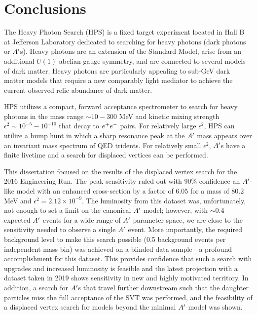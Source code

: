 \chapter{Conclusions}\label{chap:conclusion}

The Heavy Photon Search (HPS) is a fixed target experiment located in Hall B at Jefferson Laboratory dedicated to searching for heavy photons (dark photons or $A^\prime$s). Heavy photons are an extension of the Standard Model, arise from an additional $U(1)$ abelian gauge symmetry, and are connected to several models of dark matter. Heavy photons are particularly appealing to sub-GeV dark matter models that require a new comparably light mediator to achieve the current observed relic abundance of dark matter.

HPS utilizes a compact, forward acceptance spectrometer to search for heavy photons in the mass range $\sim 10 - 300$ MeV and kinetic mixing strength $\epsilon^2 \sim 10^{-5} - 10^{-10}$ that decay to $e^{+}e^{-}$ pairs. For relatively large $\epsilon^2$, HPS can utilize a bump hunt in which a sharp resonance peak at the $A^\prime$ mass appears over an invariant mass spectrum of QED tridents. For relatively small $\epsilon^2$, $A^\prime$s have a finite livetime and a search for displaced vertices can be performed.

This dissertation focused on the results of the displaced vertex search for the 2016 Engineering Run. The peak sensitivity ruled out with 90\% confidence an $A^\prime$-like model with an enhanced cross-section by a factor of 6.05 for a mass of 80.2 MeV and $\epsilon^2=2.12 \times 10^{-9}$. The luminosity from this dataset was, unfortunately, not enough to set a limit on the canonical $A^\prime$ model; however, with $\sim$0.4 expected $A^\prime$ events for a wide range of $A^\prime$ parameter space, we are close to the sensitivity needed to observe a single $A^\prime$ event. More importantly, the required background level to make this search possible (0.5 background events per independent mass bin) was achieved on a blinded data sample - a profound accomplishment for this dataset. This provides confidence that such a search with upgrades and increased luminosity is feasible and the latest projection with a dataset taken in 2019 shows sensitivity in new and highly motivated territory. In addition, a search for $A^\prime$s that travel further downstream such that the daughter particles miss the full acceptance of the SVT was performed, and the feasibility of a displaced vertex search for models beyond the minimal $A^\prime$ model was shown.